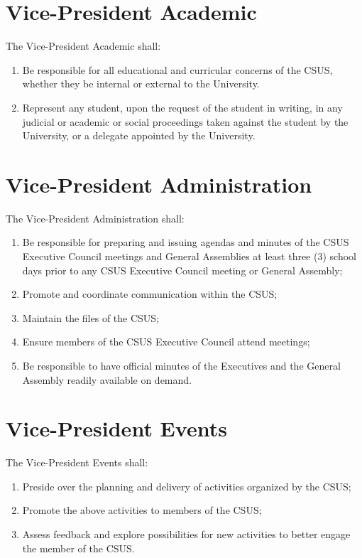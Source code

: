\section{Vice-President
Academic}\label{vice-president-academic}

The Vice-President Academic shall:

\begin{enumerate}
\def\labelenumi{\arabic{enumi}.}
\item
  Be responsible for all educational and curricular concerns of the
  CSUS, whether they be internal or external to the University.
\item
  Represent any student, upon the request of the student in writing, in
  any judicial or academic or social proceedings taken against the
  student by the University, or a delegate appointed by the University.
\end{enumerate}

\section{Vice-President
Administration}\label{vice-president-administration}

The Vice-President Administration shall:

\begin{enumerate}
\def\labelenumi{\arabic{enumi}.}
\item
  Be responsible for preparing and issuing agendas and minutes of the
  CSUS Executive Council meetings and General Assemblies at least three
  (3) school days prior to any CSUS Executive Council meeting or General
  Assembly;
\item
  Promote and coordinate communication within the CSUS;
\item
  Maintain the files of the CSUS;
\item
  Ensure members of the CSUS Executive Council attend meetings;
\item
  Be responsible to have official minutes of the Executives and the
  General Assembly readily available on demand.
\end{enumerate}

\section{Vice-President Events}\label{vice-president-events}

The Vice-President Events shall:

\begin{enumerate}
\def\labelenumi{\arabic{enumi}.}
\item
  Preside over the planning and delivery of activities organized by the
  CSUS;
\item
  Promote the above activities to members of the CSUS;
\item
  Assess feedback and explore possibilities for new activities to better
  engage the member of the CSUS.
\end{enumerate}

